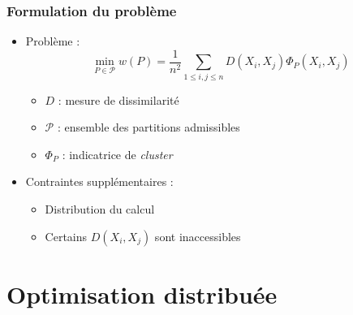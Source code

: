 \documentclass[a4paper, c]{beamer}
\begin{document}
\begin{frame}
    \frametitle{Formulation du problème}

    \begin{itemize}
        \item Problème :
        \[
            \min_{P \in \mathcal{P}} w(P) = \frac{1}{n^2} \sum_{1 \leq i,j \leq n} D(X_i, X_j) \Phi_P(X_i, X_j)
        \]
    \begin{itemize}
        \item $D$ : mesure de dissimilarit\'e
        \item $\mathcal{P}$ : ensemble des partitions admissibles
        \item $\Phi_P$ : indicatrice de \emph{cluster}
    \end{itemize}

    \item Contraintes suppl\'ementaires :
    \begin{itemize}
        \item Distribution du calcul
        \item Certains $D(X_i, X_j)$ sont inaccessibles
    \end{itemize}
    \end{itemize}

\end{frame}

\section{Optimisation distribu\'ee}
\end{document}
